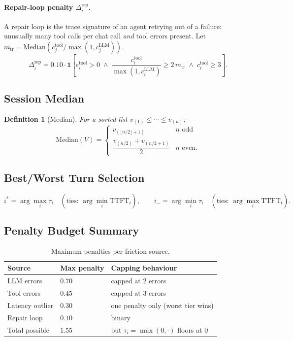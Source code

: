 \documentclass[11pt,a4paper]{article}
\newtheorem{definition}{Definition}
\begin{document}
\paragraph{Repair-loop penalty $\Delta^{\text{rep}}_i$.}
A repair loop is the trace signature of an agent retrying out of a failure:
unusually many tool calls per chat call \emph{and} tool errors present.
Let $m_{\text{tr}} = \text{Median}\!\left(c^{\text{tool}}_j / \max(1, c^{\text{LLM}}_j)\right)$.
\[
  \Delta^{\text{rep}}_i = 0.10 \cdot \mathbf{1}\!\left[
    e^{\text{tool}}_i > 0
    \;\wedge\;
    \frac{c^{\text{tool}}_i}{\max(1, c^{\text{LLM}}_i)} \geq 2\, m_{\text{tr}}
    \;\wedge\;
    c^{\text{tool}}_i \geq 3
  \right].
\]

\subsection{Session Median}

\begin{definition}[Median]
For a sorted list $v_{(1)} \leq \cdots \leq v_{(n)}$:
\[
  \text{Median}(V) =
  \begin{cases}
    v_{(\lfloor n/2 \rfloor + 1)} & n \text{ odd} \\
    \dfrac{v_{(n/2)} + v_{(n/2+1)}}{2} & n \text{ even.}
  \end{cases}
\]
\end{definition}

\subsection{Best/Worst Turn Selection}

\[
  i^* = \arg\max_i \tau_i \quad (\text{ties: } \arg\min_i \text{TTFT}_i),
  \qquad
  i_- = \arg\min_i \tau_i \quad (\text{ties: } \arg\max_i \text{TTFT}_i).
\]

\subsection{Penalty Budget Summary}

\begin{table}[h!]
\centering
\caption{Maximum penalties per friction source.}
\begin{tabular}{@{}lll@{}}
\toprule
Source & Max penalty & Capping behaviour \\
\midrule
LLM errors & $0.70$ & capped at 2 errors \\
Tool errors & $0.45$ & capped at 3 errors \\
Latency outlier & $0.30$ & one penalty only (worst tier wins) \\
Repair loop & $0.10$ & binary \\
\midrule
Total possible & $1.55$ & but $\tau_i = \max(0, \cdot)$ floors at 0 \\
\bottomrule
\end{tabular}
\end{table}
\end{document}
